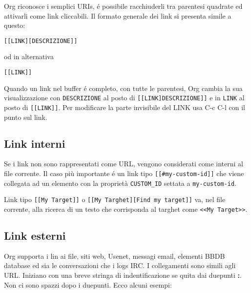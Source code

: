 \documentclass[11pt]{article}
\begin{document}
Org riconosce i semplici URIs, é possibile racchiuderli tra parentesi
quadrate ed attivarli come link cliccabili. Il formato generale dei
link si presenta simile a questo:

\begin{verbatim}
[[LINK][DESCRIZIONE]]
\end{verbatim}


od in alternativa

\begin{verbatim}
[[LINK]]
\end{verbatim}


Quando un link nel buffer é completo, con tutte le parentesi, Org
cambia la sua visualizzazione con \texttt{DESCRIZIONE} al posto di
\texttt{[[LINK]DESCRIZIONE]]} e in \texttt{LINK} al posto di \texttt{[[LINK]]}. Per
modificare la parte invisibile del LINK usa C-c C-l con il punto sul link.

\subsection*{Link interni}
\label{sec:org3026f41}
Se i link non sono rappresentati come URL, vengono considerati come
interni al file corrente. Il caso più importante é un link tipo
\texttt{[[\#my-custom-id]]} che viene collegata ad un elemento con la
proprietà \texttt{CUSTOM\_ID} settata a \texttt{my-custom-id}.

Link tipo \texttt{[[My Target]]} o \texttt{[[My Targhet][Find my target]]} va, nel
file corrente, alla ricerca di un testo che corrisponda al targhet
come \texttt{<{}<{}My Target>{}>{}}.

\subsection*{Link esterni}
\label{sec:org42b0785}
Org supporta i lin ai file, siti web, Usenet, messagi email, elementi
BBDB database ed sia le conversazioni che i logs IRC. I collegamenti
sono simili agli URL. Iniziano con una breve stringa di
indentificazione se quita dai duepunti \textbf{:}. Non ci sono spazzi dopo i
duepunti. Ecco alcuni esempi:
\end{document}

